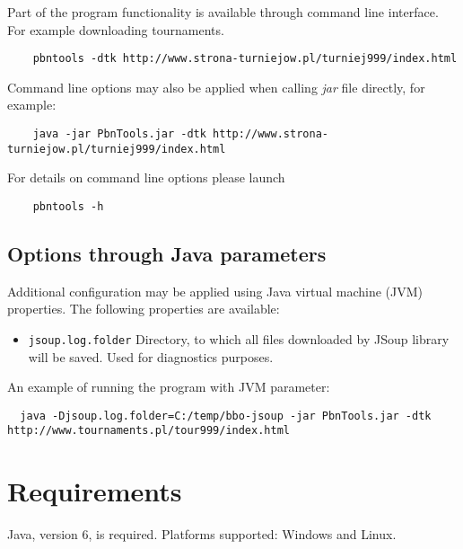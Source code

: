 \documentclass[polish,a4paper,11pt,oneside]{article}
\begin{document}
Part of the program functionality is available through command line
interface. For example downloading tournaments.

\begin{verbatim}
    pbntools -dtk http://www.strona-turniejow.pl/turniej999/index.html
\end{verbatim}

Command line options may also be applied when calling {\em jar} file
directly, for example:

\begin{verbatim}
    java -jar PbnTools.jar -dtk http://www.strona-turniejow.pl/turniej999/index.html
\end{verbatim}

For details on command line options please launch

\begin{verbatim}
    pbntools -h
\end{verbatim}

\subsection{Options through Java parameters}

Additional configuration may be applied using
Java virtual machine (JVM) properties.
The following properties are available:

\begin{itemize}
\item \verb!jsoup.log.folder! Directory, to which all files
  downloaded by JSoup library will be saved.
  Used for diagnostics purposes.
\end{itemize}

An example of running the program with JVM parameter:

\begin{verbatim}
  java -Djsoup.log.folder=C:/temp/bbo-jsoup -jar PbnTools.jar -dtk http://www.tournaments.pl/tour999/index.html
\end{verbatim}



\section{Requirements}

Java, version 6, is required. Platforms supported: Windows and Linux.

\end{document}
